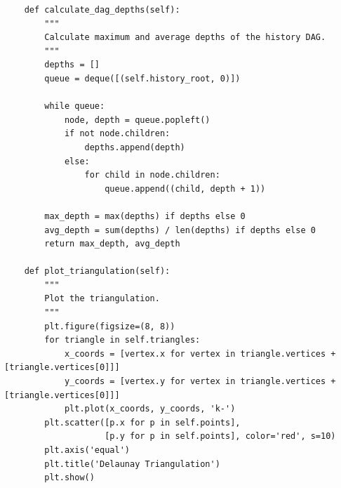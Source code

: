 \documentclass{article}
\begin{document}
\begin{verbatim}
    def calculate_dag_depths(self):
        """
        Calculate maximum and average depths of the history DAG.
        """
        depths = []
        queue = deque([(self.history_root, 0)])

        while queue:
            node, depth = queue.popleft()
            if not node.children:
                depths.append(depth)
            else:
                for child in node.children:
                    queue.append((child, depth + 1))

        max_depth = max(depths) if depths else 0
        avg_depth = sum(depths) / len(depths) if depths else 0
        return max_depth, avg_depth
    
    def plot_triangulation(self):
        """
        Plot the triangulation.
        """
        plt.figure(figsize=(8, 8))
        for triangle in self.triangles:
            x_coords = [vertex.x for vertex in triangle.vertices + [triangle.vertices[0]]]
            y_coords = [vertex.y for vertex in triangle.vertices + [triangle.vertices[0]]]
            plt.plot(x_coords, y_coords, 'k-')
        plt.scatter([p.x for p in self.points], 
                    [p.y for p in self.points], color='red', s=10)
        plt.axis('equal')
        plt.title('Delaunay Triangulation')
        plt.show()
\end{verbatim}
\end{document}
